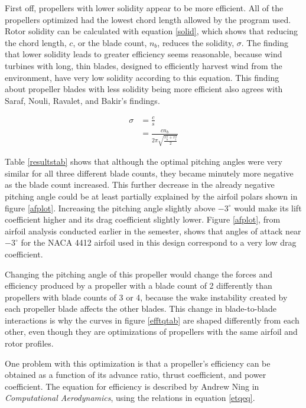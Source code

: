 \documentclass[journal ]{new-aiaa}
\begin{document}
First off, propellers with lower solidity appear to be more efficient. All of the propellers optimized had the lowest chord length allowed by the program used. Rotor solidity can be calculated with equation \eqref{solid}, which shows that reducing the chord length, $c$, or the blade count, $n_{b}$, reduces the solidity, $\sigma$. The finding that lower solidity leads to greater efficiency seems reasonable, because wind turbines with long, thin blades, designed to efficiently harvest wind from the environment, have very low solidity according to this equation. This finding about propeller blades with less solidity being more efficient also agrees with Saraf, Nouli, Ravalet, and Bakir's findings\cite{AxFlFan}.

\begin{equation}
	\begin{aligned}
	\sigma & = \frac{c}{s} \\
	& = \frac{c n_{b}}{2 \pi \sqrt{\frac{r_{h}^{2}+r_{t}^{2}}{2}}}
\end{aligned}
\label{solid}
\end{equation}

Table \eqref{resultstab} shows that although the optimal pitching angles were very similar for all three different blade counts, they became minutely more negative as the blade count increased. This further decrease in the already negative pitching angle could be at least partially explained by the airfoil polars shown in figure \eqref{afplot}. Increasing the pitching angle slightly above $-3^{\circ}$ would make its lift coefficient higher and its drag coefficient slightly lower. Figure \eqref{afplot}, from airfoil analysis conducted earlier in the semester, shows that angles of attack near $-3^{\circ}$ for the NACA 4412 airfoil used in this design correspond to a very low drag coefficient.

Changing the pitching angle of this propeller would change the forces and efficiency produced by a propeller with a blade count of 2 differently than propellers with blade counts of 3 or 4, because the wake instability created by each propeller blade affects the other blades\cite{bceff}. This change in blade-to-blade interactions is why the curves in figure \eqref{efftqtab} are shaped differently from each other, even though they are optimizations of propellers with the same airfoil and rotor profiles.

One problem with this optimization is that a propeller's efficiency can be obtained as a function of its advance ratio, thrust coefficient, and power coefficient. The equation for efficiency is described by Andrew Ning in \emph{Computational Aerodynamics}\cite{ComAer}, using the relations in equation \eqref{etqeq}.
\end{document}
